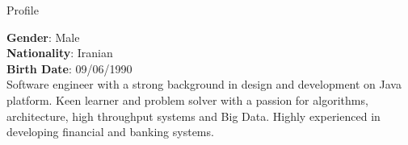 
\begin{jrsection}[location = sidebar]{Profile}
    \begin{jrdescription}
        {\bfseries Gender}: Male \\
        {\bfseries Nationality}: Iranian \\
        {\bfseries Birth Date}: 09/06/1990 \\
        Software engineer with a strong background in design and development on Java platform.
        Keen learner and problem solver with a passion for algorithms, architecture, high throughput systems and Big Data.
        Highly experienced in developing financial and banking systems.
    \end{jrdescription}
\end{jrsection}
